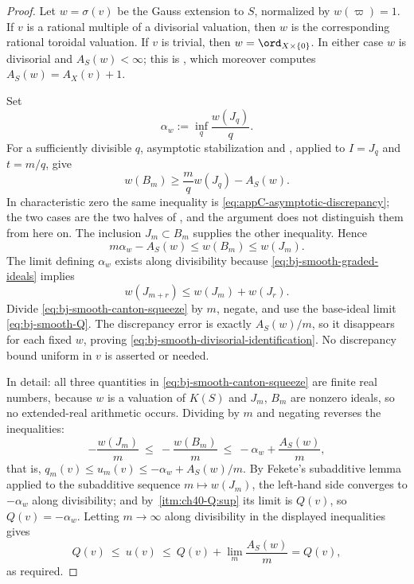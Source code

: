 \begin{proof}
Let $w=\sigma(v)$ be the Gauss extension to $S$, normalized by
$w(\varpi)=1$.  If $v$ is a rational multiple of a divisorial valuation,
then $w$ is the corresponding rational toroidal valuation.  If $v$ is
trivial, then $w=\ord_{X\times\{0\}}$.  In either case $w$ is
divisorial and $A_S(w)<\infty$; this is
, which moreover computes
$A_S(w)=A_X(v)+1$.

Set
\[
                         \alpha_w:=\inf_q\frac{w(J_q)}q.
\tag{40.26}\label{eq:bj-smooth-alpha}
\]
For a sufficiently divisible $q$, asymptotic stabilization and
, applied to $I=J_q$ and $t=m/q$, give
\[
                         w(B_m)\ge\frac mqw(J_q)-A_S(w).
\]
In characteristic zero the same inequality is
\eqref{eq:appC-asymptotic-discrepancy}; the two cases are the two halves of
, and the argument does not distinguish them
from here on.
The inclusion $J_m\subset B_m$ supplies the other inequality.  Hence
\[
              m\alpha_w-A_S(w)\le w(B_m)\le w(J_m).
\tag{40.27}\label{eq:bj-smooth-canton-squeeze}
\]
The limit defining $\alpha_w$ exists along divisibility because
\eqref{eq:bj-smooth-graded-ideals} implies
\[
                     w(J_{m+r})\le w(J_m)+w(J_r).
\]
Divide \eqref{eq:bj-smooth-canton-squeeze} by $m$, negate, and use the
base-ideal limit \eqref{eq:bj-smooth-Q}.  The discrepancy error is exactly
$A_S(w)/m$, so it disappears for each fixed $w$, proving
\eqref{eq:bj-smooth-divisorial-identification}.  No discrepancy bound
uniform in $v$ is asserted or needed.

In detail: all three quantities in
\eqref{eq:bj-smooth-canton-squeeze} are finite real numbers, because $w$ is
a valuation of $K(S)$ and $J_m$, $B_m$ are nonzero ideals, so no
extended-real arithmetic occurs.  Dividing by $m$ and negating reverses the
inequalities:
\[
 -\frac{w(J_m)}m\ \le\ -\frac{w(B_m)}m\ \le\ -\alpha_w+\frac{A_S(w)}m,
\]
that is, $q_m(v)\le u_m(v)\le-\alpha_w+A_S(w)/m$.  By Fekete's subadditive
lemma applied to the subadditive sequence $m\mapsto w(J_m)$, the left-hand
side converges to $-\alpha_w$ along divisibility; and by
\,\cref{itm:ch40-Q:sup} its limit is $Q(v)$, so
$Q(v)=-\alpha_w$.  Letting $m\to\infty$ along divisibility in the
displayed inequalities gives
\[
 Q(v)\ \le\ u(v)\ \le\ Q(v)+\lim_m\frac{A_S(w)}m=Q(v),
\]
as required.
\end{proof}

